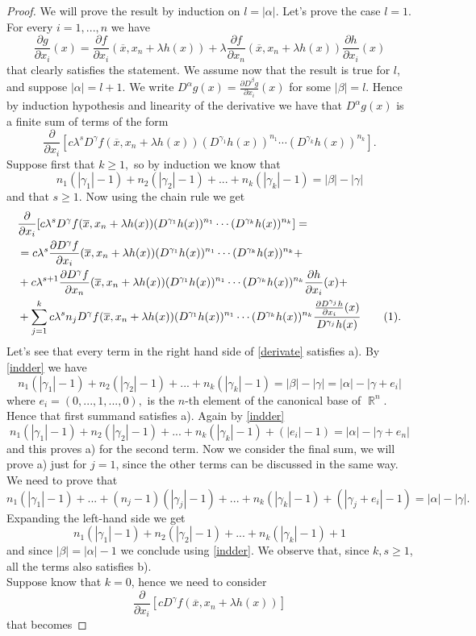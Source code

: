 \documentclass[12pt]{article}
\theoremstyle{definition}
\DeclareMathOperator\rr{\mathbb{R}}
\newcommand\addtag{\refstepcounter{equation}\tag{\theequation}}
\begin{document}
\begin{proof}
We will prove the result by induction on $l=|\alpha|.$ Let's prove the case $l=1$. For every $i=1,...,n$ we have
\[ \frac{\partial g}{\partial x_i}(x)=\frac{\partial f}{\partial x_i}(\overline x, x_n+\lambda h(x))+\lambda\frac{\partial f}{\partial x_n}(\overline x, x_n+\lambda h(x))\frac{\partial h}{\partial x_i}(x) \]
that clearly satisfies the statement. We assume now that the result is true for $l$, and suppose $|\alpha|=l+1$. We write $D^\alpha g(x)=\frac{\partial D^\beta g}{\partial x_i}(x)$ for some $|\beta|=l$. Hence by induction hypothesis and linearity of the derivative we have that $D^\alpha g(x)$ is a finite sum of terms of the form
\[ \frac{\partial}{\partial x_i} [c\lambda^s D^{\gamma} f(\overline x, x_n+\lambda h(x))(D^{\gamma_1}h(x))^{n_1}\cdots (D^{\gamma_k}h(x))^{n_k}].\]
Suppose first that $k\ge 1,$ so by induction we know that
\begin{equation}\label{indder}
 n_1(|\gamma_1|-1)+n_2(|\gamma_2|-1)+...+n_k(|\gamma_k|-1)=|\beta|-|\gamma| 
 \end{equation}
 and that $s\ge 1.$
 Now using the chain rule we get
\begin{align*}
&\frac{\partial}{\partial x_i} [c\lambda^s D^{\gamma} f(\overline x, x_n+\lambda h(x))(D^{\gamma_1}h(x))^{n_1}\cdots (D^{\gamma_k}h(x))^{n_k}]=\\
&=c\lambda^s \frac{\partial D^{\gamma} f}{\partial x_i}  (\overline x, x_n+\lambda h(x))(D^{\gamma_1}h(x))^{n_1}\cdots (D^{\gamma_k}h(x))^{n_k}+\\
&+ c\lambda^{s+1} \frac{\partial D^{\gamma} f}{\partial x_n}  (\overline x, x_n+\lambda h(x))(D^{\gamma_1}h(x))^{n_1}\cdots (D^{\gamma_k}h(x))^{n_k}\frac{\partial h}{\partial x_i} (x)+\\
&+ \sum_{j=1}^k c\lambda^sn_j D^{\gamma} f(\overline x, x_n+\lambda h(x))(D^{\gamma_1}h(x))^{n_1}\cdots (D^{\gamma_k}h(x))^{n_k} \frac{\frac{\partial D^{\gamma_j}h}{\partial x_i} (x)}{D^{\gamma_j}h(x)} \addtag \label{derivate}.
\end{align*}
Let's see that every term in the right hand side of \eqref{derivate} satisfies a). By \eqref{indder} we have
\[ n_1(|\gamma_1|-1)+n_2(|\gamma_2|-1)+...+n_k(|\gamma_k|-1)=|\beta|-|\gamma|=|\alpha|-|\gamma + e_i|\]
where $e_i=(0,...,1,...,0),$ is the $n$-th element of the canonical base of $\rr^n$. Hence that first summand satisfies a). Again by \eqref{indder}
\[ n_1(|\gamma_1|-1)+n_2(|\gamma_2|-1)+...+n_k(|\gamma_k|-1)+(|e_i|-1)=|\alpha|-|\gamma + e_n|\]
and this proves a) for the second term. Now we consider the final sum, we will prove a) just for $j=1$, since the other terms can be discussed in the same way. We need to prove that
\[ n_1(|\gamma_1|-1)+...+(n_j-1)(|\gamma_j|-1)+...+n_k(|\gamma_k|-1)+(|\gamma_j+e_i|-1)=|\alpha|-|\gamma|. \]
Expanding the left-hand side we get
\[ n_1(|\gamma_1|-1)+n_2(|\gamma_2|-1)+...+n_k(|\gamma_k|-1)+1\]
and since $|\beta|=|\alpha|-1$ we conclude using \eqref{indder}. We observe that, since $k,s\ge1$, all the terms also satisfies b). \\
Suppose know that $k=0$, hence we need to consider
\[ \frac{\partial}{\partial x_i} [c D^{\gamma} f(\overline x, x_n+\lambda h(x)) ]\]
that becomes


\end{proof}
\end{document}
